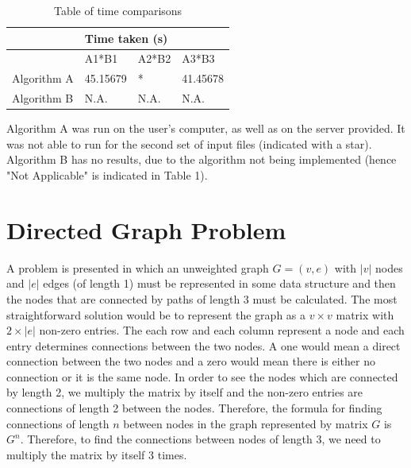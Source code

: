 \documentclass[journal, a4paper]{IEEEtran}
\begin{document}
\begin{table}[]
\centering
\caption{Table of time comparisons}
\label{my-label}
\begin{tabular}{|l|l|l|l|}
\hline
\multirow{2}{*}{} 
                   & \multicolumn{3}{l|}{Time taken (s)}                  \\ \hline
                  & A1*B1         & A2*B2        & A3*B3        \\ \cline{2-4} 
                 
Algorithm A       & 45.15679            &*              &41.45678              \\ \hline
Algorithm B       &N.A.               &N.A.              &N.A.              \\ \hline
\end{tabular}
\end{table}
Algorithm A was run on the user's computer, as well as on the server provided. It was not able to run for the second set of input files (indicated with a star). Algorithm B has no results, due to the algorithm not being implemented (hence "Not Applicable" is indicated in Table 1).
\section{Directed Graph Problem}

\noindent
A problem is presented in which an unweighted graph $G=(v,e)$ with $|v|$ nodes and $|e|$ edges (of length 1) must be represented in some data structure and then the nodes that are connected by paths of length 3 must be calculated. The most straightforward solution would be to represent the graph as a $v\times v$ matrix with $2\times|e|$ non-zero entries. The each row and each column represent a node and each entry determines connections between the two nodes. A one would mean a direct connection between the two nodes and a zero would mean there is either no connection or it is the same node. In order to see the nodes which are connected by length 2, we multiply the matrix by itself and the non-zero entries are connections of length 2 between the nodes. Therefore, the formula for finding connections of length $n$ between nodes in the graph represented by matrix $G$ is $G^n$. Therefore, to find the connections between nodes of length 3, we need to multiply the matrix by itself 3 times.
\end{document}

